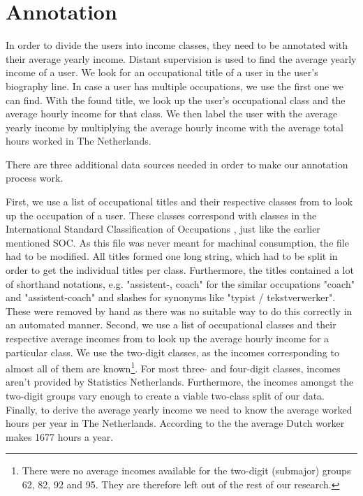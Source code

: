 \documentclass[
10pt, %
a4paper, %
oneside, %
headinclude,footinclude, %
] {book}%
\begin{document}
\section{Annotation}
In order to divide the users into income classes, they need to be annotated with their average yearly income. Distant supervision is used to find the average yearly income of a user. We look for an occupational title of a user in the user's biography line. In case a user has multiple occupations, we use the first one we can find. With the found title, we look up the user's occupational class and the average hourly income for that class. We then label the user with the average yearly income by multiplying the average hourly income with the average total hours worked in The Netherlands. 

There are three additional data sources needed in order to make our annotation process work. 

First, we use a list of occupational titles and their respective classes from \citet{codelijsten} to look up the occupation of a user. These classes correspond with classes in the International Standard Classification of Occupations \citep{isco}, just like the earlier mentioned SOC. As this file was never meant for machinal consumption, the file had to be modified. All titles formed one long string, which had to be split in order to get the individual titles per class. Furthermore, the titles contained a lot of shorthand notations, e.g. "assistent-, coach" for the similar occupations "coach" and "assistent-coach" and slashes for synonyms like "typist / tekstverwerker". These were removed by hand as there was no suitable way to do this correctly in an automated manner. 
Second, we use a list of occupational classes and their respective average incomes from \citet{uurlonen} to look up the average hourly income for a particular class. We use the two-digit classes, as the incomes corresponding to almost all of them are known\footnote{There were no average incomes available for the two-digit (submajor) groups 62, 82, 92 and 95. They are therefore left out of the rest of our research.}. For most three- and four-digit classes, incomes aren't provided by Statistics Netherlands. Furthermore, the incomes amongst the two-digit groups vary enough to create a viable two-class split of our data.
Finally, to derive the average yearly income we need to know the average worked hours per year in The Netherlands. According to the \citet{hours} the average Dutch worker makes 1677 hours a year.
\end{document}
